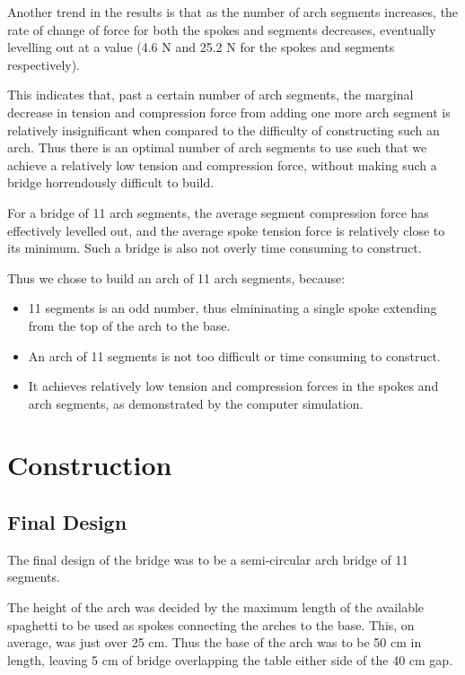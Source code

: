 \documentclass[a4paper,11pt]{article}
\begin{document}
Another trend in the results is that as the number of arch segments increases,
the rate of change of force for both the spokes and segments decreases,
eventually levelling out at a value (4.6 N and 25.2 N for the spokes and
segments respectively).

This indicates that, past a certain number of arch segments, the marginal
decrease in tension and compression force from adding one more arch segment is
relatively insignificant when compared to the difficulty of constructing such an
arch. Thus there is an optimal number of arch segments to use such that we
achieve a relatively low tension and compression force, without making such a
bridge horrendously difficult to build.

For a bridge of 11 arch segments, the average segment compression
force has effectively levelled out, and the average spoke tension force is
relatively close to its minimum.
Such a bridge is also not overly time consuming to construct.

Thus we chose to build an arch of 11 arch segments, because:

\begin{itemize}
\item 11 segments is an odd number, thus elmininating a single spoke extending
	from the top of the arch to the base.
\item An arch of 11 segments is not too difficult or time consuming to
	construct.
\item It achieves relatively low tension and compression forces in the spokes
	and arch segments, as demonstrated by the computer simulation.
\end{itemize}




\section{Construction}

\subsection{Final Design}

The final design of the bridge was to be a semi-circular arch bridge of 11
segments.

The height of the arch was decided by the maximum length of the available
spaghetti to be used as spokes connecting the arches to the base.
This, on average, was just over 25 cm.
Thus the base of the arch was to be 50 cm in length, leaving 5 cm of bridge
overlapping the table either side of the 40 cm gap.
\end{document}
